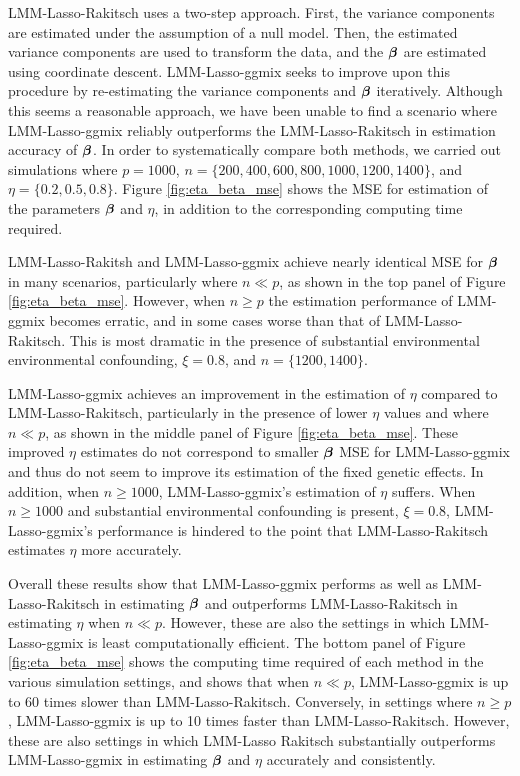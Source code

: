 LMM-Lasso-Rakitsch uses a two-step approach. First, the variance components are estimated under the assumption of a null model. Then, the estimated variance components are used to transform the data, and the $\boldsymbol{\beta}{}$ are estimated using coordinate descent. LMM-Lasso-ggmix seeks to improve upon this procedure by re-estimating the variance components and $\boldsymbol{\beta}{}$ iteratively. Although this seems a reasonable approach, we have been unable to find a scenario where LMM-Lasso-ggmix reliably outperforms the LMM-Lasso-Rakitsch in estimation accuracy of $\boldsymbol{\beta}{}$. In order to systematically compare both methods, we carried out simulations where $p = 1000$, $n = \{200, 400, 600, 800, 1000, 1200, 1400\}$, and $\eta = \{0.2, 0.5, 0.8\}$. Figure \ref{fig:eta_beta_mse} shows the MSE for estimation of the parameters $\boldsymbol{\beta}{}$ and $\eta$, in addition to the corresponding computing time required. 

LMM-Lasso-Rakitsh and LMM-Lasso-ggmix achieve nearly identical MSE for $\boldsymbol{\beta}{}$ in many scenarios, particularly where $n \ll p$, as shown in the top panel of Figure \ref{fig:eta_beta_mse}. However, when $n \ge p$ the estimation performance of LMM-ggmix becomes erratic, and in some cases worse than that of LMM-Lasso-Rakitsch. This is most dramatic in the presence of substantial environmental environmental confounding, $\xi = 0.8$, and $n = \{1200, 1400\}$. 

LMM-Lasso-ggmix achieves an improvement in the estimation of $\eta$ compared to LMM-Lasso-Rakitsch, particularly in the presence of lower $\eta$ values and where $n \ll p$, as shown in the middle panel of Figure \ref{fig:eta_beta_mse}. These improved $\eta$ estimates do not correspond to smaller $\boldsymbol{\beta}{}$ MSE for LMM-Lasso-ggmix and thus do not seem to improve its estimation of the fixed genetic effects. In addition, when $n \ge 1000$, LMM-Lasso-ggmix's estimation of $\eta$ suffers. When $n \ge 1000$ and substantial environmental confounding is present, $\xi = 0.8$,  LMM-Lasso-ggmix's performance is hindered to the point that LMM-Lasso-Rakitsch estimates $\eta$ more accurately.

Overall these results show that LMM-Lasso-ggmix performs as well as LMM-Lasso-Rakitsch in estimating $\boldsymbol{\beta}{}$ and outperforms LMM-Lasso-Rakitsch in estimating $\eta$ when $n \ll p$. However, these are also the settings in which LMM-Lasso-ggmix is least computationally efficient. The bottom panel of Figure \ref{fig:eta_beta_mse} shows the computing time required of each method in the various simulation settings, and shows that when $n \ll p$, LMM-Lasso-ggmix is up to 60 times slower than LMM-Lasso-Rakitsch. Conversely, in settings where $n \ge p$, LMM-Lasso-ggmix is up to 10 times faster than LMM-Lasso-Rakitsch. However, these are also settings in which LMM-Lasso Rakitsch substantially outperforms LMM-Lasso-ggmix in estimating $\boldsymbol{\beta}{}$ and $\eta$ accurately and consistently. 

